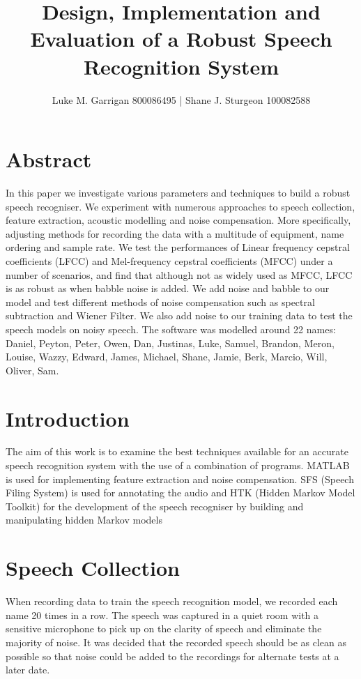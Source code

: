 \documentclass[	DIV=calc,%
							paper=a4,%
							fontsize=9.8pt,%
							twocolumn]{scrartcl}	 					%
\title{Design, Implementation and Evaluation of a Robust Speech Recognition System}					%
\author{Luke M. Garrigan 800086495 |   Shane J. Sturgeon 100082588
 }											%
\date{}																				%
\newcommand{\initial}[1]{%
     \lettrine[lines=3,lhang=0.3,nindent=0em]{
     				\color{black}
     				{\textsf{#1}}}{}}
\begin{document}
\maketitle

\thispagestyle{fancy} 			%

\section*{Abstract}
In this paper we investigate various parameters and techniques to build a robust speech recogniser. We experiment with numerous approaches to speech collection, feature extraction, acoustic modelling and noise compensation. More specifically, adjusting methods for recording the data with a multitude of equipment, name ordering and sample rate. We test the performances of  Linear frequency cepstral coefficients (LFCC) and Mel-frequency cepstral coefficients (MFCC) under a number of scenarios, and find that although not as widely used as MFCC, LFCC  is as robust as when babble noise is added. We add noise and babble to our model and test different methods of noise compensation such as spectral subtraction and Wiener Filter. We also add noise to our training data to test the speech models on noisy speech. The software was modelled around 22 names: Daniel, Peyton, Peter, Owen, Dan, Justinas, Luke, Samuel, Brandon, Meron, Louise, Wazzy, Edward, James, Michael, Shane, Jamie, Berk, Marcio, Will, Oliver, Sam. 

\section{Introduction}
The aim of this work is to examine the best techniques available for an accurate speech recognition system with the use of a combination of programs. MATLAB is used  for implementing feature extraction and noise compensation. SFS (Speech Filing System) is used for annotating the audio and HTK (Hidden Markov Model Toolkit) for the development of the speech recogniser by building and manipulating hidden Markov models

\section{Speech Collection}
When recording data to train the speech recognition model, we recorded each name 20 times in a row. The speech was captured in a quiet room with a sensitive microphone to pick up on the clarity of speech and eliminate the majority of noise. It was decided that the recorded speech should be as clean as possible so that noise could be added to the recordings for alternate tests  at a later date.
\end{document}
